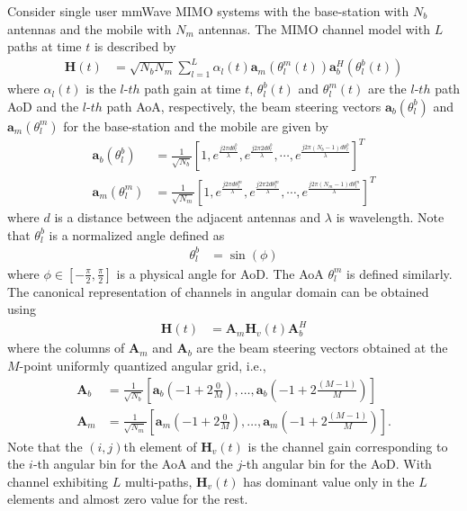 \documentclass[conference]{IEEEtran}
\begin{document}
Consider single user mmWave MIMO systems with the base-station with $N_{b}$ antennas and the mobile with $N_{m}$ antennas.  The MIMO channel model with $L$ paths at time $t$ is described by \cite{ref:static_chan_est}
\begin{align} \label{eq:physical_channel}
  \mathbf{H}(t) & = \sqrt{N_{b}N_{m}}\sum\limits_{l=1}^L\alpha_l(t)\mathbf{a}_{m}(\theta^{m}_{l}(t))\mathbf{a}_{b}^{H}(\theta^{b}_{l}(t))
\end{align}
where $\alpha_l(t)$ is the $l$-$th$ path gain at time $t$, $\theta^{b}_{l}(t)$ and $\theta^{m}_{l}(t)$ are the $l$-$th$ path AoD and the $l$-$th$ path AoA, respectively, the beam steering vectors $\mathbf{a}_{b}(\theta_l^{b})$ and $ \mathbf{a}_{m}(\theta_l^{m}) $ for the base-station and the mobile are given by  \cite{ref:static_chan_est}
 \begin{align}
  \mathbf{a}_{b}(\theta_l^{b}) & = \frac{1}{\sqrt{N_{b}}}[1,e^{\frac{j2\pi d \theta_l^{b}}{\lambda}},e^{\frac{j2\pi2d\theta_l^{b}}{\lambda}},\cdots,e^{\frac{j2\pi (N_{b}-1)d\theta_l^{b}}{\lambda}}]^{T} \nonumber \\
  \mathbf{a}_{m}(\theta_l^{m}) & = \frac{1}{\sqrt{N_{m}}}[1,e^{\frac{j2\pi d \theta_l^{m}}{\lambda}},e^{\frac{j2\pi2d\theta_l^{m}}{\lambda}},\cdots,e^{\frac{j2\pi (N_{m}-1)d\theta_l^{m}}{\lambda}}]^{T} \nonumber
\end{align}
where $d$ is a distance between the adjacent antennas and $\lambda$ is wavelength. Note that $\theta_l^{b}$ is a normalized angle defined as
\begin{align}
  \theta_l^{b} & = \sin(\phi)
\end{align}
where $\phi\in[-\frac{\pi}{2},\frac{\pi}{2}]$ is a physical angle for AoD.  The AoA $\theta_l^{m}$ is defined similarly.
The canonical representation of channels in angular domain can be obtained using \cite{ref:static_chan_est}
\begin{align} \label{eq:canon}
  \mathbf{H}(t) & = \mathbf{A}_{m}\mathbf{H}_v(t)\mathbf{A}^{H}_{b}
\end{align}
where the columns of $ \mathbf{A}_{m}$ and $\mathbf{A}_{b}$ are the beam steering vectors obtained at the $M$-point uniformly quantized angular grid, i.e.,
\begin{align}
  \mathbf{A}_b & = \frac{1}{\sqrt{N_{b}}}[\mathbf{a}_b(-1+2\frac{0}{M}),\ldots,\mathbf{a}_b(-1+2\frac{(M-1)}{M})] \nonumber \\
  \mathbf{A}_m & = \frac{1}{\sqrt{N_{m}}}[\mathbf{a}_m(-1+2\frac{0}{M}),\ldots,\mathbf{a}_m(-1+2\frac{(M-1)}{M})]. \nonumber
\end{align}
Note that the
$(i,j)$th element of $\mathbf{H}_{v}(t)$ is the channel gain corresponding to the $i$-th angular bin for the AoA and the $j$-th angular bin for the AoD.
With channel exhibiting $L$ multi-paths,  $\mathbf{H}_{v}(t)$ has dominant value only in the $L$ elements and almost zero value for  the rest.
\end{document}
